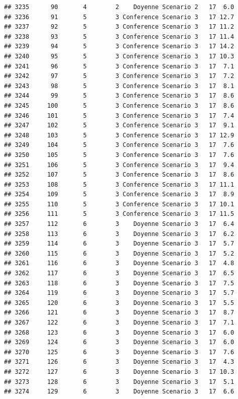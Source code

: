 \documentclass[
]{article}
\begin{document}
\begin{verbatim}
## 3235      90       4        2    Doyenne Scenario 2   17  6.0
## 3236      91       5        3 Conference Scenario 3   17 12.7
## 3237      92       5        3 Conference Scenario 3   17 11.2
## 3238      93       5        3 Conference Scenario 3   17 11.4
## 3239      94       5        3 Conference Scenario 3   17 14.2
## 3240      95       5        3 Conference Scenario 3   17 10.3
## 3241      96       5        3 Conference Scenario 3   17  7.1
## 3242      97       5        3 Conference Scenario 3   17  7.2
## 3243      98       5        3 Conference Scenario 3   17  8.1
## 3244      99       5        3 Conference Scenario 3   17  8.6
## 3245     100       5        3 Conference Scenario 3   17  8.6
## 3246     101       5        3 Conference Scenario 3   17  7.4
## 3247     102       5        3 Conference Scenario 3   17  9.1
## 3248     103       5        3 Conference Scenario 3   17 12.9
## 3249     104       5        3 Conference Scenario 3   17  7.6
## 3250     105       5        3 Conference Scenario 3   17  7.6
## 3251     106       5        3 Conference Scenario 3   17  9.4
## 3252     107       5        3 Conference Scenario 3   17  8.6
## 3253     108       5        3 Conference Scenario 3   17 11.1
## 3254     109       5        3 Conference Scenario 3   17  8.9
## 3255     110       5        3 Conference Scenario 3   17 10.1
## 3256     111       5        3 Conference Scenario 3   17 11.5
## 3257     112       6        3    Doyenne Scenario 3   17  6.4
## 3258     113       6        3    Doyenne Scenario 3   17  6.2
## 3259     114       6        3    Doyenne Scenario 3   17  5.7
## 3260     115       6        3    Doyenne Scenario 3   17  5.2
## 3261     116       6        3    Doyenne Scenario 3   17  4.8
## 3262     117       6        3    Doyenne Scenario 3   17  6.5
## 3263     118       6        3    Doyenne Scenario 3   17  7.5
## 3264     119       6        3    Doyenne Scenario 3   17  5.7
## 3265     120       6        3    Doyenne Scenario 3   17  5.5
## 3266     121       6        3    Doyenne Scenario 3   17  8.7
## 3267     122       6        3    Doyenne Scenario 3   17  7.1
## 3268     123       6        3    Doyenne Scenario 3   17  6.0
## 3269     124       6        3    Doyenne Scenario 3   17  6.0
## 3270     125       6        3    Doyenne Scenario 3   17  7.6
## 3271     126       6        3    Doyenne Scenario 3   17  4.3
## 3272     127       6        3    Doyenne Scenario 3   17 10.3
## 3273     128       6        3    Doyenne Scenario 3   17  5.1
## 3274     129       6        3    Doyenne Scenario 3   17  6.6

\end{verbatim}
\end{document}
